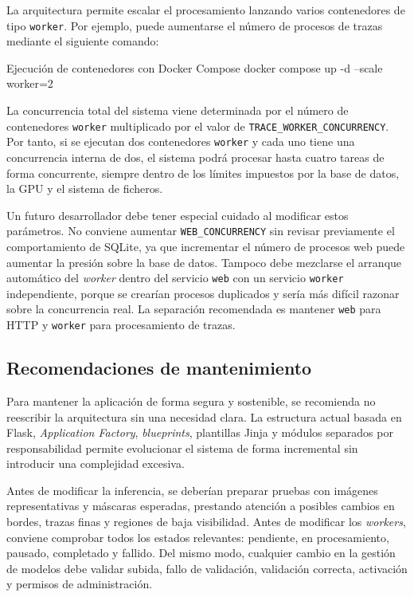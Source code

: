 La arquitectura permite escalar el procesamiento lanzando varios contenedores de tipo \texttt{worker}. Por ejemplo, puede aumentarse el número de procesos de trazas mediante el siguiente comando:

\begin{pythonbox}{Ejecución de contenedores con Docker Compose}
docker compose up -d --scale worker=2
\end{pythonbox}

La concurrencia total del sistema viene determinada por el número de contenedores \texttt{worker} multiplicado por el valor de \texttt{TRACE\_WORKER\_CONCURRENCY}. Por tanto, si se ejecutan dos contenedores \texttt{worker} y cada uno tiene una concurrencia interna de dos, el sistema podrá procesar hasta cuatro tareas de forma concurrente, siempre dentro de los límites impuestos por la base de datos, la GPU y el sistema de ficheros.

Un futuro desarrollador debe tener especial cuidado al modificar estos parámetros. No conviene aumentar \texttt{WEB\_CONCURRENCY} sin revisar previamente el comportamiento de SQLite, ya que incrementar el número de procesos web puede aumentar la presión sobre la base de datos. Tampoco debe mezclarse el arranque automático del \textit{worker} dentro del servicio \texttt{web} con un servicio \texttt{worker} independiente, porque se crearían procesos duplicados y sería más difícil razonar sobre la concurrencia real. La separación recomendada es mantener \texttt{web} para HTTP y \texttt{worker} para procesamiento de trazas.

\subsection{Recomendaciones de mantenimiento}

Para mantener la aplicación de forma segura y sostenible, se recomienda no reescribir la arquitectura sin una necesidad clara. La estructura actual basada en Flask, \textit{Application Factory}, \textit{blueprints}, plantillas Jinja y módulos separados por responsabilidad permite evolucionar el sistema de forma incremental sin introducir una complejidad excesiva. 

Antes de modificar la inferencia, se deberían preparar pruebas con imágenes representativas y máscaras esperadas, prestando atención a posibles cambios en bordes, trazas finas y regiones de baja visibilidad. Antes de modificar los \textit{workers}, conviene comprobar todos los estados relevantes: pendiente, en procesamiento, pausado, completado y fallido. Del mismo modo, cualquier cambio en la gestión de modelos debe validar subida, fallo de validación, validación correcta, activación y permisos de administración. 

